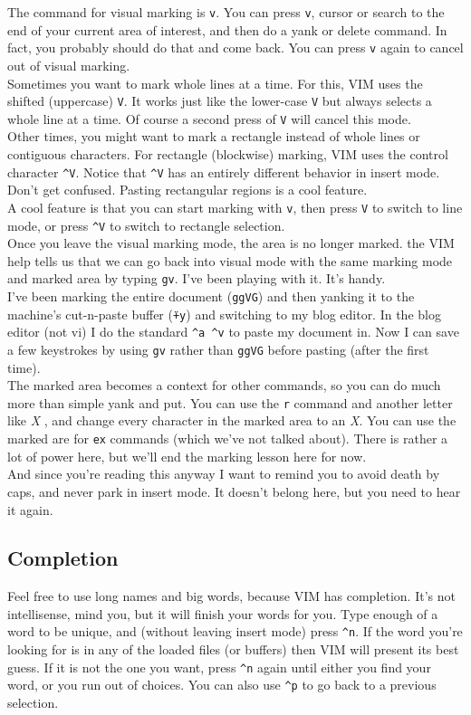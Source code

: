 \documentclass[a4paper, 12pt]{article}
\begin{document}
The command for visual marking is \texttt{v}. You can press \texttt{v}, cursor or search to the end of your current area of interest, and then do a yank or delete command. In fact, you probably should do that and come back. You can press \texttt{v} again to cancel out of visual marking.\\
Sometimes you want to mark whole lines at a time. For this, VIM uses the shifted (uppercase) \texttt{V}. It works just like the lower-case \texttt{V} but always selects a whole line at a time. Of course a second press of \texttt{V} will cancel this mode.\\
Other times, you might want to mark a rectangle instead of whole lines or contiguous characters. For rectangle (blockwise) marking, VIM uses the control character \texttt{\^{}V}. Notice that \texttt{\^{}V} has an entirely different behavior in insert mode. Don't get confused. Pasting rectangular regions is a cool feature.\\
A cool feature is that you can start marking with \texttt{v}, then press \texttt{V} to switch to line mode, or press \texttt{\^{}V} to switch to rectangle selection.\\
Once you leave the visual marking mode, the area is no longer marked. the VIM help tells us that we can go back into visual mode with the same marking mode and marked area by typing \texttt{gv}. I've been playing with it. It's handy.\\
I've been marking the entire document (\texttt{ggVG}) and then yanking it to the machine's cut-n-paste buffer (\texttt{\"{}+y}) and switching to my blog editor. In the blog editor (not vi) I do the standard \texttt{\^{}a \^{}v} to paste my document in. Now I can save a few keystrokes by using \texttt{gv} rather than \texttt{ggVG} before pasting (after the first time).\\
The marked area becomes a context for other commands, so you can do much more than simple yank and put. You can use the \texttt{r} command and another letter like \textit{X} , and change every character in the marked area to an \textit{X}. You can use the marked are for \texttt{ex} commands (which we've not talked about). There is rather a lot of power here, but we'll end the marking lesson here for now.\\
And since you're reading this anyway I want to remind you to avoid death by caps, and never park in insert mode. It doesn't belong here, but you need to hear it again.
\subsection{Completion}
\label{"Completion"}
Feel free to use long names and big words, because VIM has completion. It's not intellisense, mind you, but it will finish your words for you. Type enough of a word to be unique, and (without leaving insert mode) press \texttt{\^{}n}. If the word you're looking for is in any of the loaded files (or buffers) then VIM will present its best guess. If it is not the one you want, press \texttt{\^{}n} again until either you find your word, or you run out of choices. You can also use \texttt{\^{}p} to go back to a previous selection.
\end{document}
